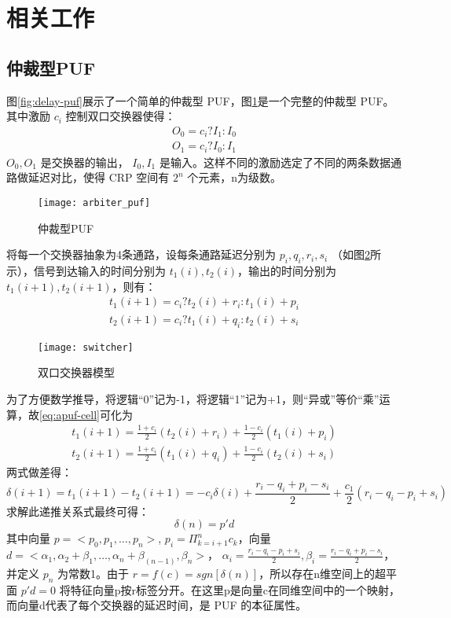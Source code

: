 \section{相关工作}\label{sec:relatedwork}
\subsection{仲裁型PUF}\label{subsec:apufmodel}
图\ref{fig:delay-puf}展示了一个简单的仲裁型 PUF，图\ref{fig:arb-puf}是一个完整的仲裁型 PUF。其中激励 $ c_i $ 控制双口交换器使得：
\begin{eqnarray}
O_0=c_i?I_1:I_0\\
O_1=c_i?I_0:I_1
\end{eqnarray}
$ O_0,O_1 $ 是交换器的输出， $ I_0,I_1 $ 是输入。这样不同的激励选定了不同的两条数据通路做延迟对比，使得 CRP 空间有 $ 2^n $ 个元素，n为级数。

\begin{figure}[htb!]
\centering
\texttt{[image: arbiter\_puf]}
\caption{仲裁型PUF}
\label{fig:arb-puf}
\end{figure}

将每一个交换器抽象为4条通路，设每条通路延迟分别为 $ p_i,q_i,r_i,s_i $ （如图\ref{fig: switcher}所示），信号到达输入的时间分别为 $ t_1(i),t_2(i) $，输出的时间分别为 $ t_1(i+1),t_2(i+1) $，则有：
\begin{eqnarray}\label{eq:apuf-cell}
t_1(i+1)=c_i?t_2(i)+r_i:t_1(i)+p_i \\
t_2(i+1)=c_i?t_1(i)+q_i:t_2(i)+s_i
\end{eqnarray}

\begin{figure}[htb!]
\centering
\texttt{[image: switcher]}
\caption{双口交换器模型}
\label{fig: switcher}
\end{figure}

为了方便数学推导，将逻辑``0''记为-1，将逻辑``1''记为+1，则``异或''等价``乘''运算，故\ref{eq:apuf-cell}可化为
\begin{eqnarray}
t_1(i+1)=\frac{1+c_i}{2}(t_2(i)+r_i)+\frac{1-c_i}{2}(t_1(i)+p_i) \\
t_2(i+1)=\frac{1+c_i}{2}(t_1(i)+q_i)+\frac{1-c_i}{2}(t_2(i)+s_i)
\end{eqnarray}
两式做差得：
\begin{equation}
\delta (i+1)=t_1(i+1)-t_2(i+1)=-c_i\delta(i)+\frac{r_i-q_i+p_i-s_i}{2}+\frac{c_1}{2}(r_i-q_i-p_i+s_i)
\end{equation}
求解此递推关系式最终可得：
\begin{equation}
\delta(n)=p'd
\end{equation}
其中向量 $ p=<p_0,p_1,…,p_n> $, $ p_i=\Pi_{k=i+1}^{n}c_k $，向量 $ d=<\alpha_1,\alpha_2+\beta_1,…,\alpha_n+\beta_(n-1),\beta_n> $， $ \alpha_i=\frac{r_i-q_i-p_i+s_i}{2},\beta_i=\frac{r_i-q_i+p_i-s_i}{2} $，并定义 $ p_n $ 为常数1。由于 $ r=f(c)=sgn[\delta(n)] $，所以存在n维空间上的超平面 $ p'd=0 $ 将特征向量p按r标签分开。在这里p是向量c在同维空间中的一个映射，而向量d代表了每个交换器的延迟时间，是 PUF 的本征属性。

